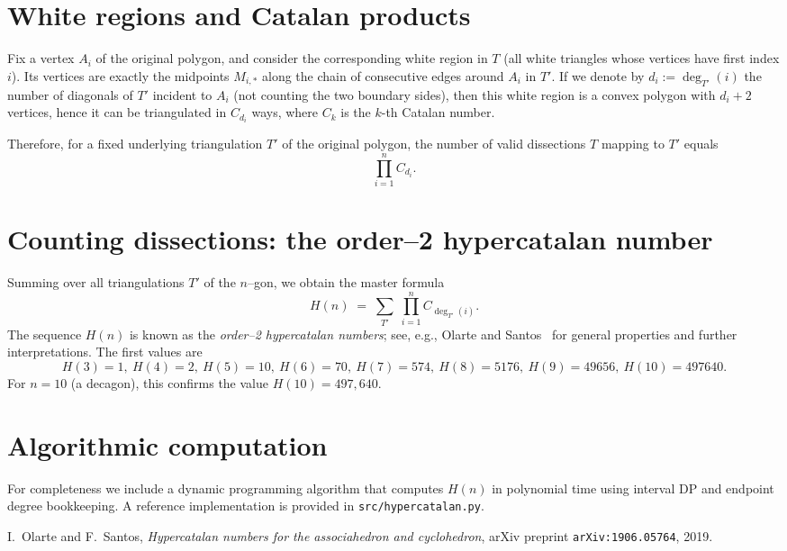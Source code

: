 \documentclass[11pt]{article}
\begin{document}
\section{White regions and Catalan products}

Fix a vertex $A_i$ of the original polygon, and consider the corresponding white region in $T$ (all white triangles whose vertices have first index $i$). Its vertices are exactly the midpoints $M_{i,*}$ along the chain of consecutive edges around $A_i$ in $T'$. If we denote by $d_i:=\deg_{T'}(i)$ the number of diagonals of $T'$ incident to $A_i$ (not counting the two boundary sides), then this white region is a convex polygon with $d_i+2$ vertices, hence it can be triangulated in $C_{d_i}$ ways, where $C_k$ is the $k$-th Catalan number.

Therefore, for a fixed underlying triangulation $T'$ of the original polygon, the number of valid dissections $T$ mapping to $T'$ equals
\[
\prod_{i=1}^n C_{d_i}.
\]

\section{Counting dissections: the order--2 hypercatalan number}

Summing over all triangulations $T'$ of the $n$--gon, we obtain the master formula
\[
H(n) \;=\; \sum_{T'} \;\prod_{i=1}^n C_{\deg_{T'}(i)}.
\]
The sequence $H(n)$ is known as the \emph{order--2 hypercatalan numbers}; see, e.g., Olarte and Santos~\cite{OlarteSantos} for general properties and further interpretations. The first values are
\[
H(3)=1,\ H(4)=2,\ H(5)=10,\ H(6)=70,\ H(7)=574,\ H(8)=5176,\ H(9)=49656,\ H(10)=497640.
\]
For $n=10$ (a decagon), this confirms the value $H(10)=497{,}640$.

\section*{Algorithmic computation}
For completeness we include a dynamic programming algorithm that computes $H(n)$ in polynomial time using interval DP and endpoint degree bookkeeping. A reference implementation is provided in \texttt{src/hypercatalan.py}.

\begin{thebibliography}{1}
I.~Olarte and F.~Santos,
\newblock \emph{Hypercatalan numbers for the associahedron and cyclohedron},
\newblock arXiv preprint \texttt{arXiv:1906.05764}, 2019.
\end{thebibliography}
\end{document}
